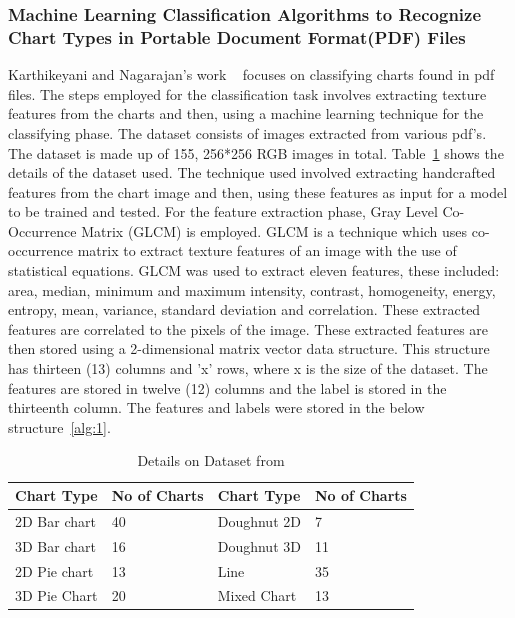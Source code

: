 \documentclass[12pt, a4paper,oneside]{report}
\begin{document}
\subsubsection{Machine Learning Classification Algorithms to Recognize Chart Types in Portable Document Format(PDF) Files}
Karthikeyani and Nagarajan's work ~\cite{karthikeyani2012machine} focuses on classifying charts found in pdf files. The steps employed for the classification task involves extracting texture features from the charts and then, using a machine learning technique for the classifying phase. The dataset consists of images extracted from various pdf's. The dataset is made up of 155, 256*256 RGB images in total. Table~\ref{table:pdf} shows the details of the dataset used.
The technique used involved extracting handcrafted features from the chart image and then, using these features as input for a model to be trained and tested.
For the feature extraction phase, Gray Level Co-Occurrence Matrix (GLCM) is employed. GLCM is a technique which uses co-occurrence matrix to extract texture features of an image with the use of statistical equations. GLCM was used to extract eleven features, these included: area, median, minimum and maximum intensity, contrast, homogeneity, energy, entropy, mean, variance, standard deviation and correlation. These extracted features are correlated to the pixels of the image. These extracted features are then stored using a 2-dimensional matrix vector data structure. This structure has thirteen (13) columns and 'x' rows, where x is the size of the dataset. The features are stored in twelve (12) columns and the label is stored in the thirteenth column. The features and labels were stored in the below structure~\ref{alg:1}.

\begin{table}[h]
	\centering {} \small
	\begin{tabular}{|p{3cm}|p{3cm}|p{3cm}|p{3cm}|}
		\hline
		Chart Type & No of Charts & Chart
		Type & No of Charts  \\ \hline
		2D Bar chart & 40 & Doughnut 2D & 7 \\ \hline
		3D Bar chart & 16 & Doughnut 3D & 11\\ \hline
		2D Pie chart & 13 & Line & 35 \\ \hline
		3D Pie Chart & 20 & Mixed Chart& 13 \\ \hline
	\end{tabular}
	\caption {Details on Dataset from \cite{karthikeyani2012machine} }	
	\label{table:pdf}
\end{table}
\end{document}
